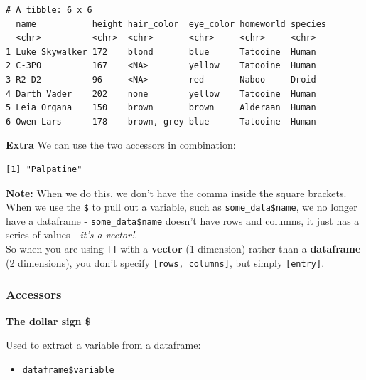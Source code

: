 \documentclass[]{book}
\newenvironment{Shaded}{\begin{snugshade}}{\end{snugshade}}
\newcommand{\CommentTok}[1]{\textcolor[rgb]{0.56,0.35,0.01}{\textit{#1}}}
\newcommand{\DecValTok}[1]{\textcolor[rgb]{0.00,0.00,0.81}{#1}}
\newcommand{\NormalTok}[1]{#1}
\newcommand{\OperatorTok}[1]{\textcolor[rgb]{0.81,0.36,0.00}{\textbf{#1}}}
\providecommand{\tightlist}{%
  \setlength{\itemsep}{0pt}\setlength{\parskip}{0pt}}
\begin{document}
\begin{verbatim}
# A tibble: 6 x 6
  name           height hair_color  eye_color homeworld species
  <chr>          <chr>  <chr>       <chr>     <chr>     <chr>  
1 Luke Skywalker 172    blond       blue      Tatooine  Human  
2 C-3PO          167    <NA>        yellow    Tatooine  Human  
3 R2-D2          96     <NA>        red       Naboo     Droid  
4 Darth Vader    202    none        yellow    Tatooine  Human  
5 Leia Organa    150    brown       brown     Alderaan  Human  
6 Owen Lars      178    brown, grey blue      Tatooine  Human  
\end{verbatim}

\textbf{Extra}
We can use the two accessors in combination:

\begin{Shaded}
\end{Shaded}

\begin{verbatim}
[1] "Palpatine"
\end{verbatim}

\textbf{Note:} When we do this, we don't have the comma inside the square brackets.\\
When we use the \texttt{\$} to pull out a variable, such as \texttt{some\_data\$name}, we no longer have a dataframe - \texttt{some\_data\$name} doesn't have rows and columns, it just has a series of values - \emph{it's a vector!}.\\
So when you are using \texttt{{[}{]}} with a \textbf{vector} (1 dimension) rather than a \textbf{dataframe} (2 dimensions), you don't specify \texttt{{[}rows,\ columns{]}}, but simply \texttt{{[}entry{]}}.

\hypertarget{accessors}{%
\subsubsection*{Accessors}\label{accessors}}

\textbf{The dollar sign \$}

Used to extract a variable from a dataframe:

\begin{itemize}
\tightlist
\item
  \texttt{dataframe\$variable}
\end{itemize}
\end{document}
